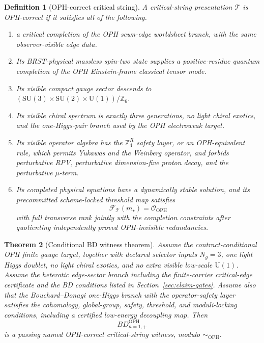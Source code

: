 \documentclass[11pt]{article}
\newtheorem{theorem}{Theorem}[section]
\newtheorem{definition}[theorem]{Definition}
\theoremstyle{remark}
\theoremstyle{plain}
\newcommand{\OPH}{\mathrm{OPH}}
\newcommand{\SU}{\mathrm{SU}}
\newcommand{\U}{\mathrm{U}}
\newcommand{\Z}{\mathbb Z}
\newcommand{\calF}{\mathcal F}
\newcommand{\calO}{\mathcal O}
\newcommand{\ZfourR}{\mathbb Z_4^R}
\newcommand{\Teq}{\sim_{\OPH}}
\begin{document}
\begin{definition}[OPH-correct critical string]
A critical-string presentation \(\mathcal T\) is OPH-correct if it satisfies all of the following.
\begin{enumerate}[leftmargin=2em]
\item a critical completion of the OPH sewn-edge worldsheet branch, with the same
observer-visible edge data.
\item Its BRST-physical massless spin-two state supplies a positive-residue quantum completion of
the OPH Einstein-frame classical tensor mode.
\item Its visible compact gauge sector descends to
\((\SU(3)\times\SU(2)\times\U(1))/\Z_6\).
\item Its visible chiral spectrum is exactly three generations, no light chiral exotics, and the
one-Higgs-pair branch used by the OPH electroweak target.
\item Its visible operator algebra has the \(\ZfourR\) safety layer, or an OPH-equivalent rule,
which permits Yukawas and the Weinberg operator, and forbids perturbative RPV, perturbative
dimension-five proton decay, and the perturbative \(\mu\)-term.
\item Its completed physical equations have a dynamically stable solution, and its precommitted
scheme-locked threshold map satisfies
\[
\calF_{\mathcal T}(m_\star)=\calO_{\OPH}
\]
with full transverse rank jointly with the completion constraints after quotienting independently
proved OPH-invisible redundancies.
\end{enumerate}
\end{definition}

\begin{theorem}[Conditional BD witness theorem]
Assume the contract-conditional OPH finite gauge target, together with declared selector inputs
\(N_g=3\), one light Higgs doublet, no light chiral exotics, and no extra visible low-scale
\(\U(1)\). Assume the heterotic edge-sector branch including the finite-carrier critical-edge
certificate and the BD conditions listed in Section~\ref{sec:claim-gates}. Assume also that
the Bouchard--Donagi one-Higgs branch with the
operator-safety layer satisfies the cohomology, global-group, safety, threshold, and moduli-locking
conditions, including a certified low-energy decoupling map. Then
\[
\boxed{BD_{n=1,+}^{\OPH}}
\]
is a passing named OPH-correct critical-string witness, modulo \(\Teq\).
\end{theorem}
\end{document}
